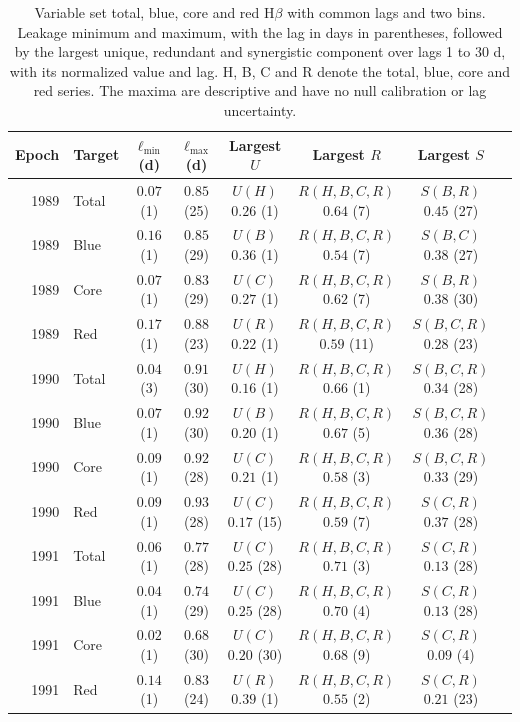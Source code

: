 \documentclass[fleqn,usenatbib]{mnras}
\newenvironment{SURDtable}{\begin{table}}{\end{table}}
\begin{document}
\begin{SURDtable}
\centering
\caption{Variable set total, blue, core and red H$\beta$ with common lags and two
bins. Leakage minimum and maximum, with the lag in days in parentheses, followed by
the largest unique, redundant and synergistic component over lags 1 to 30 d, with its
normalized value and lag. H, B, C and R denote the total, blue, core and red series.
The maxima are descriptive and have no null calibration or lag uncertainty.}
\label{tab:ep_extrema_total}
\footnotesize
\setlength{\tabcolsep}{3pt}
\begin{tabular}{rlcccccc}
\toprule
Epoch & Target & $\ell_{\min}$ (d) & $\ell_{\max}$ (d) & Largest $U$ & Largest $R$ & Largest $S$ \\
\midrule
1989 & Total & $0.07$ (1) & $0.85$ (25) & $U(H)$ $0.26$ (1) & $R(H,B,C,R)$ $0.64$ (7) & $S(B,R)$ $0.45$ (27) \\
1989 & Blue & $0.16$ (1) & $0.85$ (29) & $U(B)$ $0.36$ (1) & $R(H,B,C,R)$ $0.54$ (7) & $S(B,C)$ $0.38$ (27) \\
1989 & Core & $0.07$ (1) & $0.83$ (29) & $U(C)$ $0.27$ (1) & $R(H,B,C,R)$ $0.62$ (7) & $S(B,R)$ $0.38$ (30) \\
1989 & Red & $0.17$ (1) & $0.88$ (23) & $U(R)$ $0.22$ (1) & $R(H,B,C,R)$ $0.59$ (11) & $S(B,C,R)$ $0.28$ (23) \\
\midrule
1990 & Total & $0.04$ (3) & $0.91$ (30) & $U(H)$ $0.16$ (1) & $R(H,B,C,R)$ $0.66$ (1) & $S(B,C,R)$ $0.34$ (28) \\
1990 & Blue & $0.07$ (1) & $0.92$ (30) & $U(B)$ $0.20$ (1) & $R(H,B,C,R)$ $0.67$ (5) & $S(B,C,R)$ $0.36$ (28) \\
1990 & Core & $0.09$ (1) & $0.92$ (28) & $U(C)$ $0.21$ (1) & $R(H,B,C,R)$ $0.58$ (3) & $S(B,C,R)$ $0.33$ (29) \\
1990 & Red & $0.09$ (1) & $0.93$ (28) & $U(C)$ $0.17$ (15) & $R(H,B,C,R)$ $0.59$ (7) & $S(C,R)$ $0.37$ (28) \\
\midrule
1991 & Total & $0.06$ (1) & $0.77$ (28) & $U(C)$ $0.25$ (28) & $R(H,B,C,R)$ $0.71$ (3) & $S(C,R)$ $0.13$ (28) \\
1991 & Blue & $0.04$ (1) & $0.74$ (29) & $U(C)$ $0.25$ (28) & $R(H,B,C,R)$ $0.70$ (4) & $S(C,R)$ $0.13$ (28) \\
1991 & Core & $0.02$ (1) & $0.68$ (30) & $U(C)$ $0.20$ (30) & $R(H,B,C,R)$ $0.68$ (9) & $S(C,R)$ $0.09$ (4) \\
1991 & Red & $0.14$ (1) & $0.83$ (24) & $U(R)$ $0.39$ (1) & $R(H,B,C,R)$ $0.55$ (2) & $S(C,R)$ $0.21$ (23) \\

\end{tabular}
\end{SURDtable}
\end{document}
